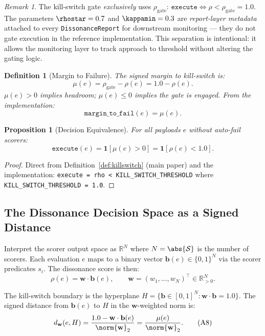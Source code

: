 \documentclass[11pt,letterpaper]{article}
\newtheorem{proposition}[theorem]{Proposition}
\newtheorem{definition}[theorem]{Definition}
\theoremstyle{remark}
\newtheorem{remark}[theorem]{Remark}
\newcommand{\rhogate}{\rho_{\mathrm{gate}}}
\newcommand{\rhosys}{\rho}
\begin{document}
\begin{remark}
  The kill-switch gate \emph{exclusively} uses $\rhogate$:
  $\texttt{execute} \Leftrightarrow \rhosys < \rhogate = 1.0$.
  The parameters $\rhostar = 0.7$ and $\kappamin = 0.3$ are
  \emph{report-layer metadata} attached to every \texttt{DissonanceReport}
  for downstream monitoring — they do not gate execution in the reference
  implementation.  This separation is intentional: it allows the monitoring
  layer to track approach to threshold without altering the gating logic.
\end{remark}

\begin{definition}[Margin to Failure]
\label{def:margin}
The \emph{signed margin to kill-switch} is:
\[
  \mu(e) = \rhogate - \rhosys(e) = 1.0 - \rhosys(e). \tag{A4}
\]
$\mu(e) > 0$ implies headroom; $\mu(e) \leq 0$ implies the gate is
engaged.  From the implementation:
\[
  \texttt{margin\_to\_fail}(e) = \mu(e). \tag{A5}
\]
\end{definition}

\begin{proposition}[Decision Equivalence]
\label{prop:decision-equiv}
For all payloads $e$ without \emph{auto-fail} scorers:
\[
  \texttt{execute}(e) = \mathbf{1}[\mu(e) > 0]
  = \mathbf{1}[\rhosys(e) < 1.0]. \tag{A6}
\]
\end{proposition}

\begin{proof}
Direct from Definition~\ref{def:killswitch} (main paper) and the
implementation: \texttt{execute = rho < KILL\_SWITCH\_THRESHOLD}
where \texttt{KILL\_SWITCH\_THRESHOLD = 1.0}.
\end{proof}

\subsection{The Dissonance Decision Space as a Signed Distance}

Interpret the scorer output space as $\mathbb{R}^N$ where $N = \abs{\mathcal{S}}$
is the number of scorers.  Each evaluation $e$ maps to a binary vector
$\mathbf{b}(e) \in \{0,1\}^N$ via the scorer predicates $s_i$.
The dissonance score is then:
\[
  \rhosys(e) = \mathbf{w} \cdot \mathbf{b}(e), \qquad
  \mathbf{w} = (w_1, \ldots, w_N)^{\top} \in \mathbb{R}_{>0}^N. \tag{A7}
\]

The kill-switch boundary is the hyperplane
$H = \{\mathbf{b} \in [0,1]^N : \mathbf{w} \cdot \mathbf{b} = 1.0\}$.
The signed distance from $\mathbf{b}(e)$ to $H$ in the $\mathbf{w}$-weighted
norm is:
\[
  d_{\mathbf{w}}(e, H)
  = \frac{1.0 - \mathbf{w} \cdot \mathbf{b}(e)}{\norm{\mathbf{w}}_2}
  = \frac{\mu(e)}{\norm{\mathbf{w}}_2}. \tag{A8}
\]
\end{document}
